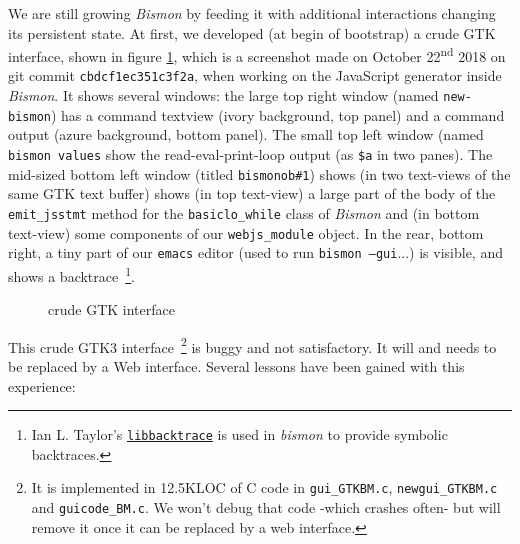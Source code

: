 We are still growing \emph{Bismon} by feeding it with additional
interactions changing its persistent state. At first, we developed (at
begin of bootstrap) a crude GTK interface,
shown in figure \ref{fig:bismonscreenshot-cbdcf}, which is a
screenshot made on October 22\textsuperscript{nd} 2018 on git commit
\texttt{cbdcf1ec351c3f2a}, when working on the JavaScript generator
inside \emph{Bismon}. It shows several windows: the large top right
window (named \texttt{new-bismon}) has a command textview (ivory
background, top panel) and a command output (azure background, bottom
panel). The small top left window (named \texttt{bismon values} show
the read-eval-print-loop output (as \texttt{\$a} in two panes). The
mid-sized bottom left window (titled \texttt{bismonob\#1}) shows (in
two text-views of the same GTK text buffer) shows (in top text-view) a
large part of the body of the \texttt{emit\_jsstmt} method for the
\texttt{basiclo\_while} class of \emph{Bismon} and (in bottom
text-view) some components of our \texttt{webjs\_module} object. In
the rear, bottom right, a tiny part of our \texttt{emacs} editor (used
to run \texttt{bismon --gui}...) is visible, and shows a
backtrace~\footnote{Ian L. Taylor's
  \href{https://github.com/ianlancetaylor/libbacktrace}{\texttt{libbacktrace}}
  is used in \emph{bismon} to provide symbolic backtraces.}.


\begin{figure}[h]
  \begin{center}
  \end{center}
  \caption{crude {} GTK interface
    {}}
  \label{fig:bismonscreenshot-cbdcf}
\end{figure}

This crude GTK3 interface~\footnote{It is implemented in 12.5KLOC of C
  code in \texttt{gui\_GTKBM.c}, \texttt{newgui\_GTKBM.c} and
  \texttt{guicode\_BM.c}. We won't debug that code -which crashes
  often- but will remove it once it can be replaced by a web
  interface.} is buggy and not satisfactory. It will and needs to be
replaced by a Web interface. Several lessons have been gained with
this experience:

